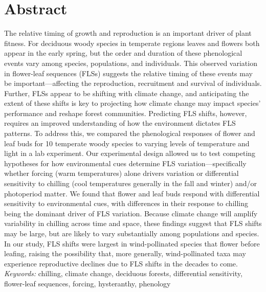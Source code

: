 \documentclass[11pt]{article}\usepackage[]{graphicx}\usepackage[]{color}
\begin{document}
\section*{Abstract}  %
The relative timing of growth and reproduction is an important driver of plant fitness. For deciduous woody species in temperate regions leaves and flowers both appear in the early spring, but the order and duration of these phenological events vary among species, populations, and individuals. This observed variation in flower-leaf sequences (FLSs) suggests the relative timing of these events may be important---affecting the reproduction, recruitment and survival of individuals. Further, FLSs appear to be shifting with climate change, and anticipating the extent of these shifts is key to projecting how climate change may impact species' performance and reshape forest communities. Predicting FLS shifts, however, requires an improved understanding of how the environment dictates FLS patterns. To address this, we compared the phenological responses of flower and leaf buds for 10 temperate woody species to varying levels of temperature and light in a lab experiment. Our experimental design allowed us to test competing hypotheses for how environmental cues determine FLS variation---specifically whether forcing (warm temperatures) alone drivers variation or differential sensitivity to chilling (cool temperatures generally in the fall and winter) and/or photoperiod matter. We found that flower and leaf buds respond with differential sensitivity to environmental cues, with differences in their response to chilling being the dominant driver of FLS variation. Because climate change will amplify variability in chilling across time and space, these findings suggest that FLS shifts may be large, but are likely to vary substantially among populations and species. In our study, FLS shifts were largest in wind-pollinated species that flower before leafing, raising the possibility that, more generally, wind-pollinated taxa may experience reproductive declines due to FLS shifts in the decades to come.   \\ %

\noindent \emph{Keywords:} chilling, climate change, deciduous forests, differential sensitivity, flower-leaf sequences, forcing, hysteranthy, phenology  \\ 
\end{document}
